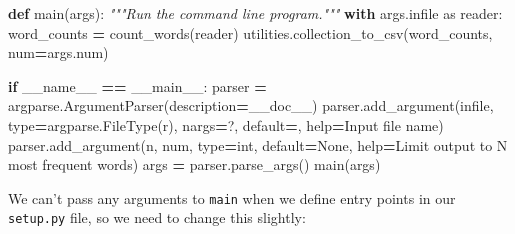 \documentclass[
]{krantz}
\makeatletter
\newenvironment{Shaded}{\begin{snugshade}}{\end{snugshade}}
\newcommand{\BuiltInTok}[1]{#1}
\newcommand{\CommentTok}[1]{\textcolor[rgb]{0.56,0.35,0.01}{\textit{#1}}}
\newcommand{\ControlFlowTok}[1]{\textcolor[rgb]{0.13,0.29,0.53}{\textbf{#1}}}
\newcommand{\ImportTok}[1]{#1}
\newcommand{\KeywordTok}[1]{\textcolor[rgb]{0.13,0.29,0.53}{\textbf{#1}}}
\newcommand{\NormalTok}[1]{#1}
\newcommand{\OperatorTok}[1]{\textcolor[rgb]{0.81,0.36,0.00}{\textbf{#1}}}
\newcommand{\StringTok}[1]{\textcolor[rgb]{0.31,0.60,0.02}{#1}}
\newcommand{\VariableTok}[1]{\textcolor[rgb]{0.00,0.00,0.00}{#1}}
\newenvironment{kframe}{%
\medskip{}
\setlength{\fboxsep}{.8em}
 \def\at@end@of@kframe{}%
 \ifinner\ifhmode%
  \def\at@end@of@kframe{\end{minipage}}%
  \begin{minipage}{\columnwidth}%
 \fi\fi%
 \def\FrameCommand##1{\hskip\@totalleftmargin \hskip-\fboxsep
 \colorbox{shadecolor}{##1}\hskip-\fboxsep
     \hskip-\linewidth \hskip-\@totalleftmargin \hskip\columnwidth}%
 \MakeFramed {\advance\hsize-\width
   \@totalleftmargin\z@ \linewidth\hsize
   \@setminipage}}%
 {\par\unskip\endMakeFramed%
 \at@end@of@kframe}
\renewenvironment{Shaded}{\begin{kframe}}{\end{kframe}}
\makeatother
\begin{document}
\begin{Shaded}
\begin{Highlighting}[]
\KeywordTok{def}\NormalTok{ main(args):}
    \CommentTok{"""Run the command line program."""}
    \ControlFlowTok{with}\NormalTok{ args.infile }\ImportTok{as}\NormalTok{ reader:}
\NormalTok{        word\_counts }\OperatorTok{=}\NormalTok{ count\_words(reader)}
\NormalTok{    utilities.collection\_to\_csv(word\_counts, num}\OperatorTok{=}\NormalTok{args.num)}

\ControlFlowTok{if} \VariableTok{\_\_name\_\_} \OperatorTok{==} \StringTok{\textquotesingle{}\_\_main\_\_\textquotesingle{}}\NormalTok{:}
\NormalTok{    parser }\OperatorTok{=}\NormalTok{ argparse.ArgumentParser(description}\OperatorTok{=}\NormalTok{\_\_doc\_\_)}
\NormalTok{    parser.add\_argument(}\StringTok{\textquotesingle{}infile\textquotesingle{}}\NormalTok{, }\BuiltInTok{type}\OperatorTok{=}\NormalTok{argparse.FileType(}\StringTok{\textquotesingle{}r\textquotesingle{}}\NormalTok{), nargs}\OperatorTok{=}\StringTok{\textquotesingle{}?\textquotesingle{}}\NormalTok{,}
\NormalTok{                        default}\OperatorTok{=}\StringTok{\textquotesingle{}{-}\textquotesingle{}}\NormalTok{, }\BuiltInTok{help}\OperatorTok{=}\StringTok{\textquotesingle{}Input file name\textquotesingle{}}\NormalTok{)}
\NormalTok{    parser.add\_argument(}\StringTok{\textquotesingle{}{-}n\textquotesingle{}}\NormalTok{, }\StringTok{\textquotesingle{}{-}{-}num\textquotesingle{}}\NormalTok{, }\BuiltInTok{type}\OperatorTok{=}\BuiltInTok{int}\NormalTok{, default}\OperatorTok{=}\VariableTok{None}\NormalTok{,}
                        \BuiltInTok{help}\OperatorTok{=}\StringTok{\textquotesingle{}Limit output to N most frequent words\textquotesingle{}}\NormalTok{)}
\NormalTok{    args }\OperatorTok{=}\NormalTok{ parser.parse\_args()}
\NormalTok{    main(args)}
\end{Highlighting}
\end{Shaded}

We can't pass any arguments to \texttt{main} when we define entry points in our \texttt{setup.py} file,
so we need to change this slightly:
\end{document}
